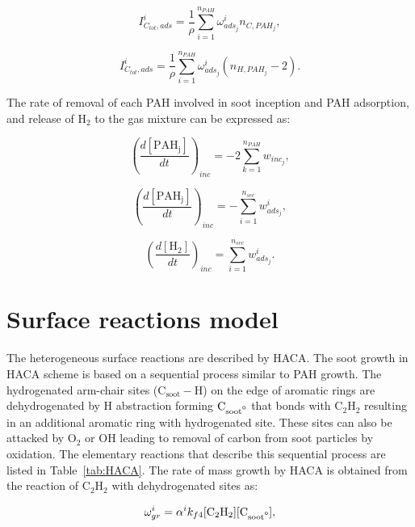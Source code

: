 \begin{equation}
	I^i_{C_{tot},ads} =
	\frac{1}{\rho}
	\sum_{i=1}^{n_{PAH}}
	\omega^i_{ads_j}
	n_{C,PAH_j}
	\label{eqn:ICtotads_ebri},
\end{equation}

\begin{equation}
	I^i_{C_{tot},ads} =
	\frac{1}{\rho}
	\sum_{i=1}^{n_{PAH}}
	\omega^i_{ads_j}
	\left(n_{H,PAH_j}-2\right)
	\label{eqn:IHtotads_ebri}.
\end{equation}

The rate of removal of each PAH involved in soot inception and PAH adsorption, and release of $\mathrm{H_2}$ to the gas mixture can be expressed as:

\begin{equation}
	\left(
	\frac{d\left[{\mathrm{PAH_j}}\right]}{dt}
	\right)_{inc}
	= 
	-2\sum_{k=1}^{n_{PAH}}w_{inc_{j}},
\end{equation}

\begin{equation}
	\left(
	\frac{d\left[{\mathrm{PAH_j}}\right]}{dt}
	\right)_{inc}
	= 
	-\sum_{i=1}^{n_{sec}}w^i_{ads_j},
	\label{eqn:PAHscrub_ebri_ads}
\end{equation}

\begin{equation}
	\left(
	\frac{d\left[{\mathrm{H_2}}\right]}{dt}
	\right)_{inc}
	= 
	\sum_{i=1}^{n_{sec}}w^i_{ads_j}.
	\label{eqn:H2scrub_ebri}
\end{equation}

\section{Surface reactions model}
\label{sec:surfreacmodel}
The heterogeneous surface reactions are described by HACA. The soot growth in HACA scheme is based on a sequential process similar to PAH growth. The hydrogenated arm-chair sites ($\mathrm{C_{soot}-H}$) on the edge of aromatic rings are dehydrogenated by H abstraction forming $\mathrm{C_{soot\mbox{\textdegree}}}$ that bonds with $\mathrm{C_2H_2}$ resulting in an additional aromatic ring with hydrogenated site. These sites can also be attacked by $\mathrm{O_2}$ or $\mathrm{OH}$ leading to removal of carbon from soot particles by oxidation. The elementary reactions that describe this sequential process are listed in Table~\ref{tab:HACA}.
The rate of mass growth by HACA is obtained from the reaction of $\mathrm{C_2H_2}$ with dehydrogenated sites as:

\begin{equation}
	\omega^i_{gr} = \alpha^i k_{f4} [\mathrm{C_2H_2}][\mathrm{C_{soot\mbox{\textdegree}}}]
	\label{eqn:hacaRate},
\end{equation}

